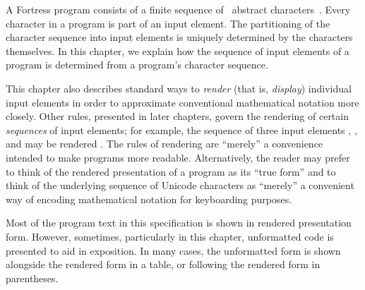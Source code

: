 
A Fortress program consists of a finite sequence
of \unicode\ abstract characters~\cite{Unicode}.
Every character in a program is part of an input element.
The partitioning of the character sequence into input elements
is uniquely determined by the characters themselves.
In this chapter,
we explain how the sequence of input elements of a program is determined
from a program's character sequence.

This chapter also describes standard ways
to \emph{render} (that is, \emph{display}) individual input elements
in order to approximate conventional mathematical notation more closely.
Other rules, presented in later chapters, govern the rendering of
certain \emph{sequences} of input elements; for example,
the sequence of three input elements
, , and  may be rendered .
The rules of rendering are ``merely'' a convenience intended
to make programs more readable.  Alternatively, the reader may prefer
to think of the rendered presentation of a program as its ``true form''
and to think of the underlying sequence of Unicode characters
as ``merely'' a convenient way of encoding mathematical
notation for keyboarding purposes.

Most of the program text in this specification
is shown in rendered presentation form.
However, sometimes, particularly in this chapter,
unformatted code is presented to aid in exposition.
In many cases, the unformatted form is shown alongside
the rendered form in a table,
or following the rendered form in parentheses.

